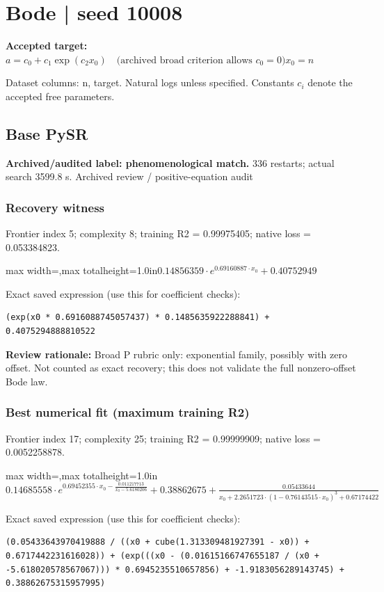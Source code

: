 \documentclass[10pt,letterpaper,landscape]{article}
\begin{document}
\section*{Bode | seed 10008}
\textbf{Accepted target:} $\displaystyle a=c_0+c_1\exp(c_2x_0)\quad\text{(archived broad criterion allows }c_0=0\text{)}$\hfill $x_0=n$\par
{\small Dataset columns: n, target. Natural logs unless specified. Constants $c_i$ denote the accepted free parameters.}\par\medskip
\begin{minipage}[t]{0.485\textwidth}
\subsection*{Base PySR}
\textbf{Archived/audited label: phenomenological match.} 336 restarts; actual search 3599.8 s.
{\small Archived review / positive-equation audit}
\subsubsection*{Recovery witness}
Frontier index 5; complexity 8; training R2 = 0.99975405; native loss = 0.053384823.
\begin{center}\begin{adjustbox}{max width=\linewidth,max totalheight=1.0in}$\displaystyle 0.14856359 \cdot e^{0.69160887 \cdot x_{0}} + 0.40752949$\end{adjustbox}\end{center}
{\scriptsize Exact saved expression (use this for coefficient checks):}
\begin{lstlisting}
(exp(x0 * 0.6916088745057437) * 0.1485635922288841) + 0.4075294888810522
\end{lstlisting}
{\small\textbf{Review rationale:} Broad P rubric only: exponential family, possibly with zero offset. Not counted as exact recovery; this does not validate the full nonzero-offset Bode law.}
\subsubsection*{Best numerical fit (maximum training R2)}
Frontier index 17; complexity 25; training R2 = 0.99999909; native loss = 0.0052258878.
\begin{center}\begin{adjustbox}{max width=\linewidth,max totalheight=1.0in}$\displaystyle 0.14685558 \cdot e^{0.69452355 \cdot x_{0} - \frac{0.011217713}{x_{0} - 5.6180206}} + 0.38862675 + \frac{0.05433644}{x_{0} + 2.2651723 \cdot \left(1 - 0.76143515 \cdot x_{0}\right)^{3} + 0.67174422}$\end{adjustbox}\end{center}
{\scriptsize Exact saved expression (use this for coefficient checks):}
\begin{lstlisting}
(0.05433643970419888 / ((x0 + cube(1.313309481927391 - x0)) + 0.6717442231616028)) + (exp(((x0 - (0.01615166747655187 / (x0 + -5.618020578567067))) * 0.6945235510657856) + -1.9183056289143745) + 0.38862675315957995)
\end{lstlisting}
\end{minipage}\hfill
\end{document}

